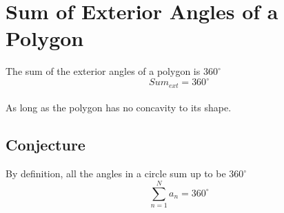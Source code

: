 \section{Sum of Exterior Angles of a Polygon}

The sum of the exterior angles of a polygon is \(360^{\circ}\)
\[Sum_{ext} = 360^{\circ}\]
\\
As long as the polygon has no concavity to its shape.

\subsection{Conjecture}

By definition, all the angles in a circle sum up to be \(360^{\circ}\) \\
\[\sum\limits_{n=1}^{N}{a_n} = 360^{\circ}\] \\

